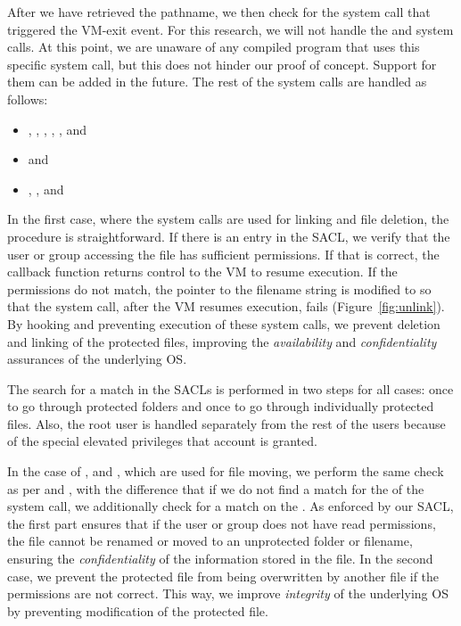 \par After we have retrieved the pathname, we then check for the system call that triggered the VM-exit event. For this research, we will not handle the  and  system calls. At this point, we are unaware of any compiled program that uses this specific system call, but this does not hinder our proof of concept. Support for them can be added in the future. The rest of the system calls are handled as follows: 


\begin{itemize}
	\item {}, , , , , and 
	\item {} and 
	\item {}, , and 
\end{itemize}

\par In the first case, where the system calls are used for linking and file deletion, the procedure is straightforward. If there is an entry in the \ac{SACL}, we verify that the user or group accessing the file has sufficient permissions. If that is correct, the callback function returns control to the \ac{VM} to resume execution. If the permissions do not match, the pointer to the filename string is modified to  so that the system call, after the \ac{VM} resumes execution, fails (Figure~\ref{fig:unlink}). By hooking and preventing execution of these system calls, we prevent deletion and linking of the protected files, improving the \emph{availability} and \emph{confidentiality} assurances of the underlying \ac{OS}.

\par The search for a match in the \ac{SACL}s is performed in two steps for all cases: once to go through protected folders and once to go through individually protected files. Also, the root user is handled separately from the rest of the users because of the special elevated privileges that account is granted. 

\par In the case of ,  and , which are used for file moving, we perform the same check as per  and , with the difference that if we do not find a match for the  of the system call, we additionally check for a match on the . As enforced by our \ac{SACL}, the first part ensures that if the user or group does not have read permissions, the file cannot be renamed or moved to an unprotected folder or filename, ensuring the \emph{confidentiality} of the information stored in the file. In the second case, we prevent the protected file from being overwritten by another file if the permissions are not correct. This way, we improve \emph{integrity} of the underlying \ac{OS} by preventing modification of the protected file. 

